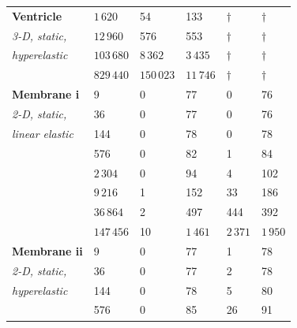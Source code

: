 \documentclass[sn-mathphys,Numbered]{sn-jnl}%
\begin{document}
\begin{table}[!htbp]
\begin{tabular}{ll|ll|ll}
			\textbf{Ventricle} & $1\,620$ & 54 & 133 				& $\dag$ & $\dag$  \\ %
			\emph{3-D, static,}& $12\,960$ & 576 & 553 			& $\dag$  & $\dag$ \\ %
			\emph{hyperelastic} & $103\,680$ & $8\,362$ & $3\,435$ 	& $\dag$  & $\dag$ \\ %
				& $829\,440$ & $150\,023$ & $11\,746$ 			& $\dag$  & $\dag$ \\ %
			\hline
			\textbf{Membrane i} & 9 & 0 & 77 	& 0 & 76 \\
			\emph{2-D, static,}& 36 & 0 & 77  	& 0 & 76 \\
			\emph{linear elastic}& 144 & 0 & 78  & 0 & 78 \\
				& 576 & 0 & 82 				& 1 & 84 \\
				& $2\,304$ & 0 & 94 			& 4 & 102 \\
				& $9\,216$ & 1 & 152 		& 33 & 186 \\
				& $36\,864$ & 2& 497 		& 444 & 392 \\
				& $147\,456$ & 10& $1\,461$ 	& $2\,371$ & $1\,950$ \\
			\hline
			\textbf{Membrane ii} 	& 9 				& 0 & 77 		& 1 & 78 \\
			\emph{2-D, static,} 	& 36 				& 0 & 77 		& 2 & 78 \\
			\emph{hyperelastic} 	& 144 			& 0 & 78 		& 5 & 80 \\
							& 576 			& 0 & 85 		& 26 & 91 \\

\end{tabular}
\end{table}
\end{document}
